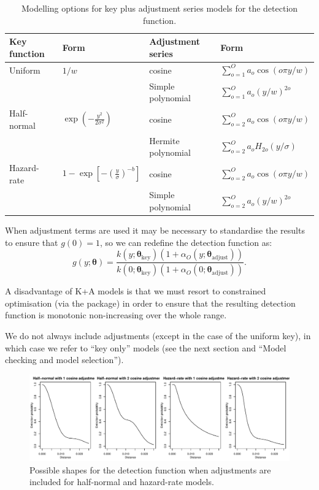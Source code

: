 \documentclass[article]{jss}
\begin{document}
\begin{table}
\caption{Modelling options for key plus adjustment series models for the detection function.}
\begin{tabular}{llll}
\hline
Key function   & Form   & Adjustment series & Form\\
\hline
 Uniform  & $1/w$   & cosine  & $\sum_{o=1}^O a_o \cos(o \pi y/w)$ \\
 & & Simple polynomial & $\sum_{o=1}^O a_o (y/w)^{2o}$ \\
 Half-normal  & $\exp\left(-\frac{y^2}{2 \sigma^2}\right)$ & cosine  & $\sum_{o=2}^O a_o \cos(o \pi y/w)$ \\
 & & Hermite polynomial & $\sum_{o=2}^O a_o H_{2o}(y/\sigma)$ \\
 Hazard-rate  & $1-\exp\left[-\left(\frac{y}{\sigma}\right)^{-b}\right]$ & cosine  & $\sum_{o=2}^O a_o \cos(o \pi y/w)$ \\
 & & Simple polynomial & $\sum_{o=2}^O a_o (y/w)^{2o}$ \\
\hline
\end{tabular}
\label{tab:keyadj}
\end{table}

When adjustment terms are used it may be necessary to standardise the
results to ensure that \(g(0)=1\), so we can redefine the detection
function as: \[
g(y; \boldsymbol{\theta}) = \frac{k(y; \boldsymbol{\theta}_\text{key})\left( 1+ \alpha_O(y; \boldsymbol{\theta}_\text{adjust})\right)}{k(0; \boldsymbol{\theta}_\text{key})\left( 1+ \alpha_O(0; \boldsymbol{\theta}_\text{adjust})\right)}.
\]

A disadvantage of K+A models is that we must resort to constrained
optimisation (via the  package) in order to ensure that the
resulting detection function is monotonic non-increasing over the whole
range.

We do not always include adjustments (except in the case of the uniform
key), in which case we refer to ``key only'' models (see the next
section and ``Model checking and model selection'').

\begin{CodeChunk}
\begin{figure}

{\centering \includegraphics{paper_files/figure-latex/adjust-mix-comp-1} 

}

\caption{Possible shapes for the detection function when adjustments are included for half-normal and hazard-rate models.\label{fig:keyadj}}\label{fig:adjust-mix-comp}
\end{figure}
\end{CodeChunk}
\end{document}
